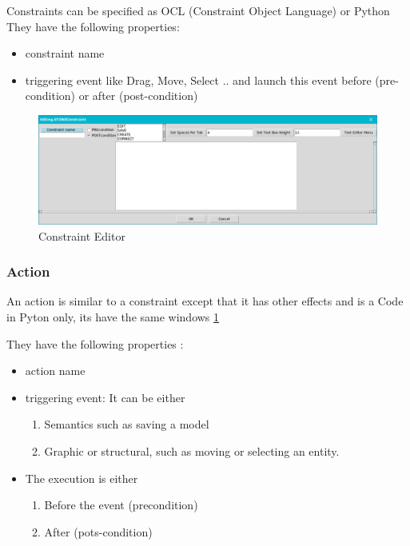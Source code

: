 Constraints can be specified as OCL (Constraint Object Language) or Python
They have the following properties: 
\begin{itemize}
\newcommand{\localtextbulletone}{\textcolor{gray}{\raisebox{.45ex}{\rule{.6ex}{.6ex}}}}
\renewcommand{\labelitemi}{\localtextbulletone}
\item constraint name
\item triggering event like Drag, Move, Select ..
and launch this event before (pre-condition) or after (post-condition)
 
\end{itemize}
 

\begin{figure}[th]
	\centering
	\includegraphics[scale=0.37]{ch3/img/const}
	\caption{\label{fig:Constraint Editor}Constraint Editor}
\end{figure} 

\subsubsection{Action}

An action is similar to a constraint except that it has other effects and is a
Code in Pyton only, its have the same windows \ref{fig:Constraint Editor} 

They have the following properties :
\begin{itemize}
\newcommand{\localtextbulletone}{\textcolor{gray}{\raisebox{.45ex}{\rule{.6ex}{.6ex}}}}
\renewcommand{\labelitemi}{\localtextbulletone}
\item action name
\item triggering event: It can be either
	\begin{enumerate}
	\item Semantics such as saving a model
	\item Graphic or structural, such as moving or selecting an entity.
	\end{enumerate}
	
\item The execution is either
	\begin{enumerate}
	\item Before the event (precondition)
	\item After (pots-condition) 
	\end{enumerate}

\end{itemize}
 


